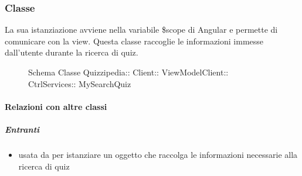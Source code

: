 \subsubsection{Classe }
La sua istanziazione avviene nella variabile \$scope di Angular e permette di comunicare con la view. Questa classe raccoglie le informazioni immesse dall'utente durante la ricerca di quiz.
\begin{figure}[H]
\centering
\noindent{}
\caption[Schema Classe MySearchQuiz]{Schema Classe Quizzipedia:: Client:: ViewModelClient:: CtrlServices:: MySearchQuiz}
\end{figure}
\paragraph{Relazioni con altre classi}
\subparagraph{Entranti}
\begin{itemize}
\item usata da  per istanziare un oggetto che raccolga le informazioni necessarie alla ricerca di quiz
\end{itemize}
